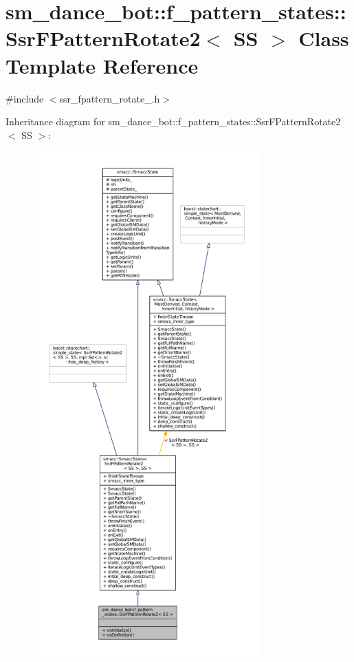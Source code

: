 \hypertarget{structsm__dance__bot_1_1f__pattern__states_1_1SsrFPatternRotate2}{}\section{sm\+\_\+dance\+\_\+bot\+:\+:f\+\_\+pattern\+\_\+states\+:\+:Ssr\+F\+Pattern\+Rotate2$<$ SS $>$ Class Template Reference}
\label{structsm__dance__bot_1_1f__pattern__states_1_1SsrFPatternRotate2}


{\ttfamily \#include $<$ssr\+\_\+fpattern\+\_\+rotate\+\_.\+h$>$}



Inheritance diagram for sm\+\_\+dance\+\_\+bot\+:\+:f\+\_\+pattern\+\_\+states\+:\+:Ssr\+F\+Pattern\+Rotate2$<$ SS $>$\+:
\nopagebreak
\begin{figure}[H]
\begin{center}
\leavevmode
\includegraphics[height=550pt]{structsm__dance__bot_1_1f__pattern__states_1_1SsrFPatternRotate2__inherit__graph}
\end{center}
\end{figure}


